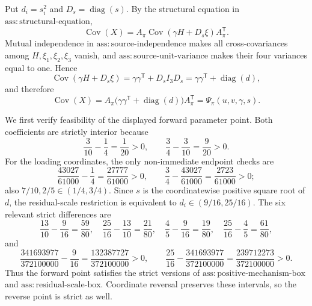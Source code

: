 Put \(d_i=s_i^2\) and \(D_s=\operatorname{diag}(s)\).  By the structural equation in \(\mathrm{ass{:}structural\text{-}equation}\),
\[
 \operatorname{Cov}(X)
 =A_\pi\operatorname{Cov}(\gamma H+D_s\xi)A_\pi^{\mathsf T}.
\]
Mutual independence in \(\mathrm{ass{:}source\text{-}independence}\) makes all cross-covariances among \(H,\xi_1,\xi_2,\xi_3\) vanish, and \(\mathrm{ass{:}source\text{-}unit\text{-}variance}\) makes their four variances equal to one.  Hence
\[
 \operatorname{Cov}(\gamma H+D_s\xi)
 =\gamma\gamma^{\mathsf T}+D_s I_3D_s
 =\gamma\gamma^{\mathsf T}+\operatorname{diag}(d),
\]
and therefore
\[
 \operatorname{Cov}(X)
 =A_\pi\bigl(\gamma\gamma^{\mathsf T}+\operatorname{diag}(d)\bigr)A_\pi^{\mathsf T}
 =\Psi_\pi(u,v,\gamma,s).
 \tag{1}
\]

We first verify feasibility of the displayed forward parameter point.  Both coefficients are strictly interior because
\[
 \frac{3}{10}-\frac14=\frac1{20}>0,
 \qquad
 \frac34-\frac{3}{10}=\frac9{20}>0.
\]
For the loading coordinates, the only non-immediate endpoint checks are
\[
 \frac{43027}{61000}-\frac14=\frac{27777}{61000}>0,
 \qquad
 \frac34-\frac{43027}{61000}=\frac{2723}{61000}>0;
\]
also \(7/10,2/5\in(1/4,3/4)\).  Since \(s\) is the coordinatewise positive square root of \(d\), the residual-scale restriction is equivalent to \(d_i\in(9/16,25/16)\).  The six relevant strict differences are
\[
 \frac{13}{10}-\frac9{16}=\frac{59}{80},\quad
 \frac{25}{16}-\frac{13}{10}=\frac{21}{80},\quad
 \frac45-\frac9{16}=\frac{19}{80},\quad
 \frac{25}{16}-\frac45=\frac{61}{80},
\]
and
\[
 \frac{341693977}{372100000}-\frac9{16}
 =\frac{132387727}{372100000}>0,
 \qquad
 \frac{25}{16}-\frac{341693977}{372100000}
 =\frac{239712273}{372100000}>0.
\]
Thus the forward point satisfies the strict versions of \(\mathrm{ass{:}positive\text{-}mechanism\text{-}box}\) and \(\mathrm{ass{:}residual\text{-}scale\text{-}box}\).  Coordinate reversal preserves these intervals, so the reverse point is strict as well.

